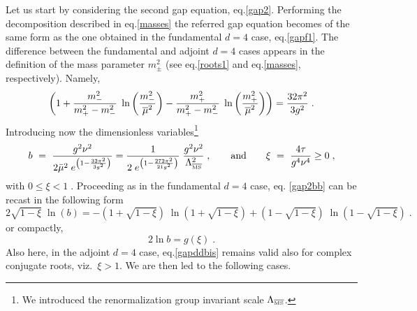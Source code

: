 Let us start by considering the second gap equation, eq.\eqref{gap2}. Performing the decomposition described in eq.\eqref{masses} the referred gap equation becomes of the same form as the one obtained in the fundamental $d=4$ case, eq.\eqref{gapf1}. The difference between the fundamental and adjoint $d=4$ cases appears in the definition of the mass parameter $m^{2}_{\pm}$ (see eq.\eqref{roots1} and eq.\eqref{masses}, respectively). Namely,
\begin{equation}
\left(1 + \frac{m^2_-}{m^2_+ -  m^2_-}\; \ln\left( \frac{m^2_-}{{\overline{\mu}}^2} \right)  - \frac{m^2_+}{m^2_+ -  m^2_-}\; \ln\left( \frac{m^2_+}{{\overline{\mu}}^2} \right)  \right) = \frac{32\pi^2}{3g^2}  \;. \label{gap2bb}
\end{equation}
Introducing now the dimensionless variables\footnote{We introduced the renormalization group invariant scale $\Lambda_{\overline{\mbox{\tiny{MS}}}}$. }
\begin{eqnarray}
b ~=~  \frac{g^2\nu^2}{2 {\bar \mu}^2\; e^{\left(1-\frac{32\pi^2}{3g^2}\right)} } =\frac{1}{2\; e^{\left( 1 -\frac{272 \pi^2}{21 g^2} \right)}}  \;\frac{g^2\nu^2}{\Lambda_{\overline{\mbox{\tiny{MS}}}}^2  } \;, \qquad \text{and} \qquad 
 \xi  ~=~  \frac{4\tau}{g^4\nu^4}  \geq 0\;,
\label{vb}
\end{eqnarray}
with $0 \le \xi < 1 \;$. Proceeding as in the fundamental $d=4$ case, eq. \eqref{gap2bb} can be recast in the following form
\begin{equation}
2 \sqrt{1-\xi}\; \ln(b) = -  \left( 1 +  \sqrt{1-\xi} \right) \; \ln\left( 1 +  \sqrt{1-\xi} \right) +  \left( 1 -  \sqrt{1-\xi} \right) \; \ln\left( 1 - \sqrt{1-\xi} \right)  \;. \label{gapdd}
\end{equation}
or compactly,
\begin{equation}
2\ln b=g(\xi)\;. \label{gapddbis}
\end{equation}
Also here, in the adjoint $d=4$ case, eq.\eqref{gapddbis} remains valid also for complex conjugate roots, viz.~$\xi>1$. We are then led to the following cases.


